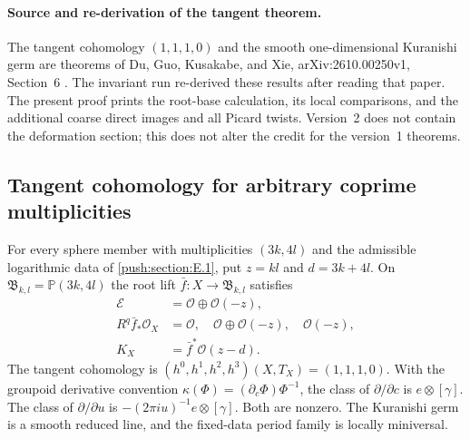 \paragraph{Source and re-derivation of the tangent theorem.}
The tangent cohomology $(1,1,1,0)$ and the smooth one-dimensional
Kuranishi germ are theorems of Du, Guo, Kusakabe, and Xie,
arXiv:2610.00250v1, Section~6 \citep{DuEtAl2026v1}.
The invariant run re-derived these results after reading that paper.
The present proof prints the root-base calculation, its local
comparisons, and the additional coarse direct images and all Picard
twists. Version~2 \citep{DuEtAl2026v2} does not contain the deformation
section; this does not alter the credit for the version~1 theorems.



\subsection{Tangent cohomology for arbitrary coprime multiplicities}\label{push:section:E.2}
\begin{theorem}\label{push:src:E.2.1}
For every sphere member with multiplicities $(3k,4l)$ and the
admissible logarithmic data of \ref{push:section:E.1}, put $z=kl$ and $d=3k+4l$.
On $\mathfrak B_{k,l}=\mathbb P(3k,4l)$ the root lift
$\bar f:X\to\mathfrak B_{k,l}$ satisfies
\[
 \begin{split}
 \mathcal E&=\mathcal O\oplus\mathcal O(-z),\\
 R^q\bar f_*\mathcal O_X&=
 \mathcal O,\quad\mathcal O\oplus\mathcal O(-z),\quad\mathcal O(-z),\\
 K_X&=\bar f^*\mathcal O(z-d).
 \end{split}
\]
The tangent cohomology is $(h^0,h^1,h^2,h^3)(X,T_X)=(1,1,1,0)$.
With the groupoid derivative convention
$\kappa(\Phi)=(\partial_c\Phi)\Phi^{-1}$, the class of
$\partial/\partial c$ is $e\otimes[\gamma]$.  The class of
$\partial/\partial u$ is
$-(2\pi i u)^{-1}e\otimes[\gamma]$.  Both are nonzero.
The Kuranishi germ is a smooth reduced line, and the fixed-data
period family is locally miniversal.
\end{theorem}

